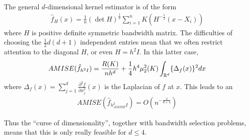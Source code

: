 The general $d$-dimensional kernel estimator is of the form
\begin{align}
  \label{eq:47}
  \hat f_{H}(x) = \frac{1}{n} (\det H)^{\frac{1}{2}} \sum_{i=1}^{n}
  K(H^{-\frac{1}{2}}(x - X_{i}))
\end{align} where $H$ is positive definite symmetric bandwidth matrix.
The difficulties of choosing the $\frac{1}{2} d(d+1)$ independent
entries mean that we often restrict attention to the diagonal $H$, or
even $H = h^{2} I$.  In this latter case,
\begin{align}
  \label{eq:48}
  AMISE(\hat f_{h^{2}I}) = \frac{R(K)}{n h^{d}} + \frac{1}{4} h^{4}
  \mu_{2}^{2}(K) \int_{\mathbb{R}^{d}} \{ \Delta_{f}(x) \}^{2} dx
\end{align} where $\Delta_{f}(x) = \sum_{j=1}^{d} \frac{\partial^{2}
  f}{\partial x_{j}^{2}}(x)$ is the Laplacian of $f$ at $x$.  This leads
to an
\begin{align}
  \label{eq:49}
  AMISE(\hat f_{h^{2}_{AMISE}I}) = O(n^{-\frac{4}{d + 4}})
\end{align}

Thus the ``curse of dimensionality'', together with bandwidth
selection problems, means that this is only really feasible for $d
\leq 4$.


\iffalse
#+ORGTBL: SEND testtbl orgtbl-to-latex :splice nil :skip 0
| Kernel     | Efficiency |
|------------+------------|
| Epachnikov |        1.0 |
| Normal     |      0.951 |
| Triangular |      0.986 |
| Uniform    |      0.930 |
\fi